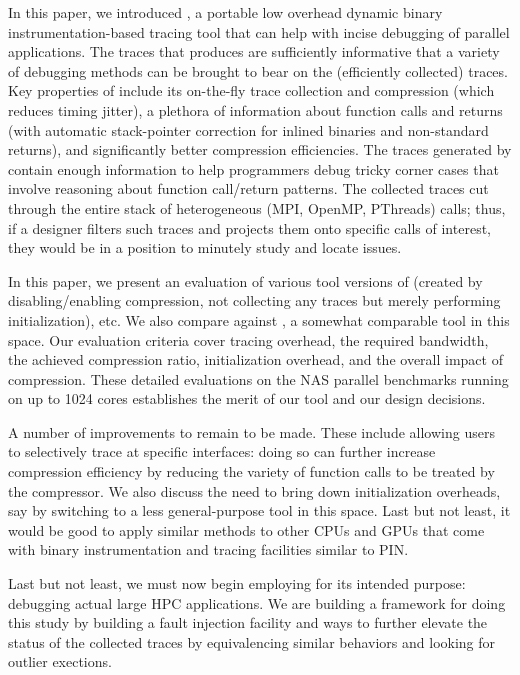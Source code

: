 

In this paper, we introduced \parlot, a portable low overhead dynamic
binary instrumentation-based
tracing tool that can help with incise debugging of parallel applications.
%
The traces that \parlot produces are sufficiently informative that
a variety of debugging methods can be brought to bear on the
(efficiently collected) traces.
%
Key properties of \parlot include its on-the-fly trace collection and
compression (which reduces timing jitter), a plethora of information
about function calls and returns (with automatic stack-pointer 
correction for inlined binaries and non-standard returns), and
significantly better compression efficiencies.
%
The traces generated by
\parlot  contain enough information to help programmers debug
tricky corner cases that involve reasoning about function call/return
patterns.
%
The collected traces cut through the entire stack of heterogeneous
(MPI, OpenMP, PThreads) calls; thus, if a designer filters such traces
and projects them onto specific calls of interest, they would be in 
a position to minutely study and locate issues.


In this paper, we present an evaluation of various tool versions of \parlot
(created by disabling/enabling compression, not collecting any traces but
merely performing initialization), etc.
%
We also compare \parlot against \callgrind, a somewhat comparable tool
in this space.
%
Our evaluation criteria cover tracing overhead, the required bandwidth,
the achieved compression ratio, initialization overhead, and the 
overall impact of compression.
%
These detailed evaluations on the NAS parallel benchmarks running on
up to 1024 cores establishes the merit of our tool and our design
decisions.


A number of improvements to \parlot remain to be made.
%
These include allowing users to selectively trace at specific
interfaces: doing so can further increase compression efficiency
by reducing the variety of function calls to be treated by
the compressor.
%
We also discuss the need to bring down initialization overheads, say
by switching to a less general-purpose tool in this space.
%
Last but not least, it would be good to apply similar methods to
other CPUs and GPUs that come with binary instrumentation and tracing
facilities similar to PIN.


Last but not least, we must now begin employing \parlot for its
intended purpose: debugging actual large HPC applications.
%
We are  building a framework for doing this study by building
a fault injection facility and ways to further elevate the
status of the collected traces by equivalencing similar behaviors
and looking for outlier exections.









